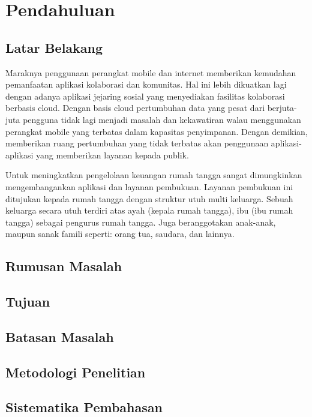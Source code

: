 \chapter{Pendahuluan}
\label{chap:pendahuluan}

\section{Latar Belakang}
\label{sec:latarbelakang}


Maraknya penggunaan perangkat mobile dan internet memberikan kemudahan pemanfaatan aplikasi kolaborasi dan komunitas. Hal ini lebih dikuatkan lagi dengan adanya aplikasi jejaring sosial yang menyediakan fasilitas kolaborasi berbasis cloud. Dengan basis cloud pertumbuhan data yang pesat dari berjuta-juta pengguna tidak lagi menjadi masalah dan kekawatiran walau menggunakan perangkat mobile yang terbatas dalam kapasitas penyimpanan. Dengan demikian, memberikan ruang pertumbuhan yang tidak terbatas akan penggunaan aplikasi-aplikasi yang memberikan layanan kepada publik.

Untuk meningkatkan pengelolaan keuangan rumah tangga sangat dimungkinkan mengembangankan aplikasi dan layanan pembukuan. Layanan pembukuan ini ditujukan kepada rumah tangga dengan struktur utuh multi keluarga. Sebuah keluarga secara utuh terdiri atas ayah (kepala rumah tangga), ibu (ibu rumah tangga) sebagai pengurus rumah tangga. Juga beranggotakan anak-anak, maupun sanak famili seperti: orang tua, saudara, dan lainnya.

\section{Rumusan Masalah}
\label{sec:rumusanmalasah}

\section{Tujuan}
\label{sec:tujuan}

\section{Batasan Masalah}
\label{sec:batasanmasalah}

\section{Metodologi Penelitian}
\label{sec:metodologipenelitian}

\section{Sistematika Pembahasan}
\label{sec:sistematikapembahasan}